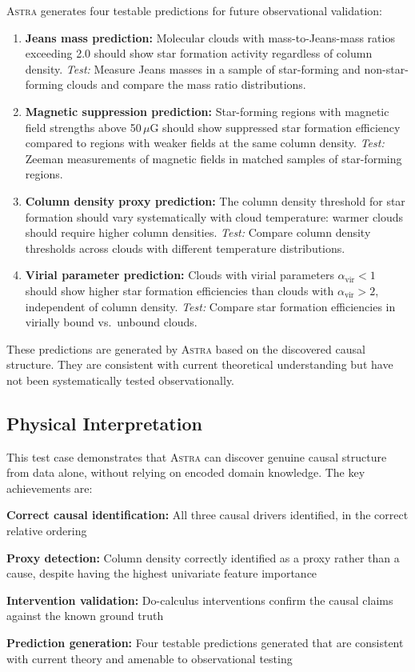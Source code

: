 \documentclass[usenatbib]{rasti}
\newcommand{\astra}{\textsc{Astra}\xspace}
\begin{document}
\astra generates four testable predictions for future observational validation:
\begin{enumerate}
  \item[(P1)] \textbf{Jeans mass prediction:} Molecular clouds with mass-to-Jeans-mass ratios exceeding 2.0 should show star formation activity regardless of column density. \emph{Test:} Measure Jeans masses in a sample of star-forming and non-star-forming clouds and compare the mass ratio distributions.

  \item[(P2)] \textbf{Magnetic suppression prediction:} Star-forming regions with magnetic field strengths above 50\,$\mu$G should show suppressed star formation efficiency compared to regions with weaker fields at the same column density. \emph{Test:} Zeeman measurements of magnetic fields in matched samples of star-forming regions.

  \item[(P3)] \textbf{Column density proxy prediction:} The column density threshold for star formation should vary systematically with cloud temperature: warmer clouds should require higher column densities. \emph{Test:} Compare column density thresholds across clouds with different temperature distributions.

  \item[(P4)] \textbf{Virial parameter prediction:} Clouds with virial parameters $\alpha_\mathrm{vir} < 1$ should show higher star formation efficiencies than clouds with $\alpha_\mathrm{vir} > 2$, independent of column density. \emph{Test:} Compare star formation efficiencies in virially bound vs.\ unbound clouds.
\end{enumerate}

These predictions are generated by \astra based on the discovered causal structure. They are consistent with current theoretical understanding but have not been systematically tested observationally.

\subsection{Physical Interpretation}
\label{sec:tc6:interpretation}

This test case demonstrates that \astra can discover genuine causal structure from data alone, without relying on encoded domain knowledge.
The key achievements are:
\begin{description}
  \item \textbf{Correct causal identification:} All three causal drivers identified, in the correct relative ordering
  \item \textbf{Proxy detection:} Column density correctly identified as a proxy rather than a cause, despite having the highest univariate feature importance
  \item \textbf{Intervention validation:} Do-calculus interventions confirm the causal claims against the known ground truth
  \item \textbf{Prediction generation:} Four testable predictions generated that are consistent with current theory and amenable to observational testing
\end{description}
\end{document}
